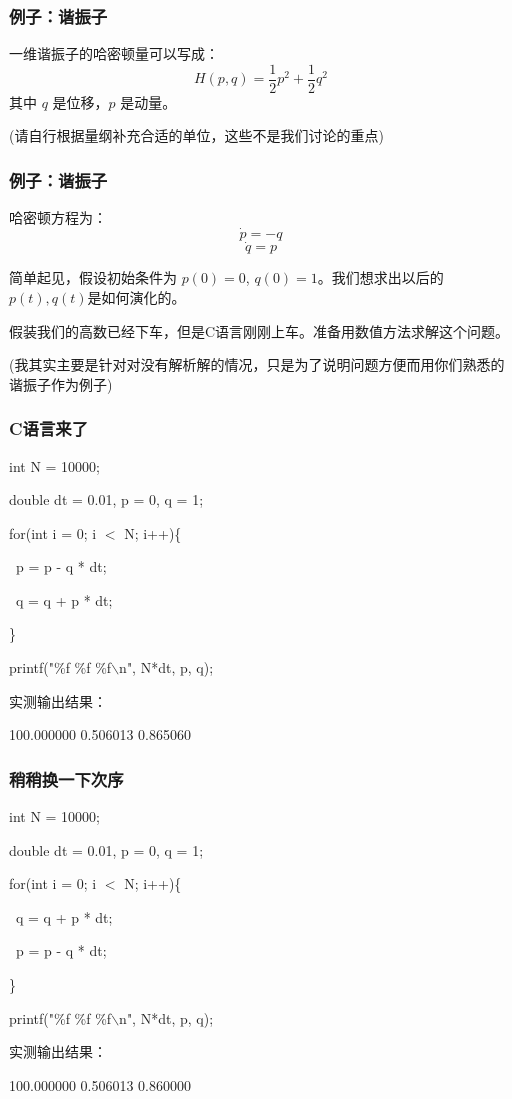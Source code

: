 \documentclass[CJK]{beamer}
\begin{document}
\begin{frame}
  \frametitle{例子：谐振子}
  一维谐振子的哈密顿量可以写成：
  $$ H(p, q) =   \frac{1}{2} p^2 + \frac{1}{2} q^2$$
  其中 $q$ 是位移，$p$ 是动量。
  
  (请自行根据量纲补充合适的单位，这些不是我们讨论的重点)
\end{frame}


\begin{frame}
  \frametitle{例子：谐振子}
  哈密顿方程为：
  $$\dot p = -q $$
  $$\dot q = p $$

  简单起见，假设初始条件为  $p(0)= 0$, $q(0)=1$。我们想求出以后的 $p(t), q(t)$是如何演化的。

  \skipline
  
  假装我们的高数已经下车，但是C语言刚刚上车。准备用数值方法求解这个问题。

  \skipline
  

  (我其实主要是针对对没有解析解的情况，只是为了说明问题方便而用你们熟悉的谐振子作为例子)  
\end{frame}


\begin{frame}
  \frametitle{C语言来了}

  int N = 10000;
  
  double dt = 0.01,  p = 0, q = 1;

  for(int i = 0; i $<$ N; i++)\{
    
  \  p = p - q * dt;

  \  q = q + p * dt;
  
  \}

  printf("\%f \%f  \%f$\backslash$n", N*dt, p, q);

  \skiplines
  
  实测输出结果：

  100.000000 0.506013  0.865060
  
\end{frame}


\begin{frame}
  \frametitle{稍稍换一下次序}

  int N = 10000;
  
  double dt = 0.01,  p = 0, q = 1;

  for(int i = 0; i $<$ N; i++)\{    

  \  q = q + p * dt;

  \  p = p - q * dt;  
  
  \}

  printf("\%f \%f  \%f$\backslash$n", N*dt, p, q);

  \skiplines

  实测输出结果：

  100.000000 0.506013  0.860000
  
\end{frame}
\end{document}
